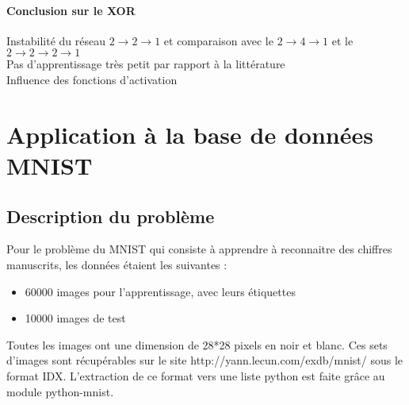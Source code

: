 
\paragraph{Conclusion sur le XOR} %
\label{par:conclusion_sur_le_xor}
Instabilité du réseau $2\rightarrow2\rightarrow1$ et comparaison avec le $ 2 \rightarrow 4 \rightarrow 1 $ et le $2 \rightarrow 2 \rightarrow 2 \rightarrow 1 $ \\
Pas d'apprentissage très petit par rapport à la littérature\\
Influence des fonctions d'activation

\section{Application à la base de données MNIST}

\subsection*{Description du problème} %

Pour le problème du MNIST qui consiste à apprendre à reconnaitre des chiffres manuscrits, les données étaient les suivantes : 
\begin{itemize}
	\item 60000 images pour l’apprentissage, avec leurs étiquettes
	\item 10000 images de test
\end{itemize}

Toutes les images ont une dimension de 28*28 pixels en noir et blanc. Ces sets d’images sont récupérables sur le site http://yann.lecun.com/exdb/mnist/ sous le format IDX. L’extraction de ce format vers une liste python est faite grâce au module python-mnist.

